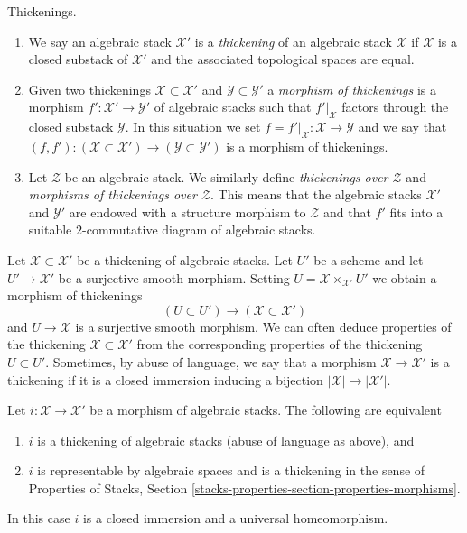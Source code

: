 \begin{definition}
\label{definition-thickening}
Thickenings.
\begin{enumerate}
\item We say an algebraic stack $\mathcal{X}'$ is a {\it thickening}
of an algebraic stack $\mathcal{X}$ if $\mathcal{X}$ is a closed substack
of $\mathcal{X}'$ and the associated topological spaces are equal.
\item Given two thickenings $\mathcal{X} \subset \mathcal{X}'$ and
$\mathcal{Y} \subset \mathcal{Y}'$ a {\it morphism of thickenings}
is a morphism $f' : \mathcal{X}' \to \mathcal{Y}'$ of algebraic stacks
such that $f'|_\mathcal{X}$ factors through the closed
substack $\mathcal{Y}$. In this situation we set
$f = f'|_\mathcal{X} : \mathcal{X} \to \mathcal{Y}$ and we say that
$(f, f') : (\mathcal{X} \subset \mathcal{X}') \to
(\mathcal{Y} \subset \mathcal{Y}')$ is a morphism of thickenings.
\item Let $\mathcal{Z}$ be an algebraic stack. We similarly define
{\it thickenings over $\mathcal{Z}$} and
{\it morphisms of thickenings over $\mathcal{Z}$}.
This means that the algebraic stacks
$\mathcal{X}'$ and $\mathcal{Y}'$
are endowed with a structure
morphism to $\mathcal{Z}$ and that $f'$ fits into a suitable
$2$-commutative diagram of algebraic stacks.
\end{enumerate}
\end{definition}

\noindent
Let $\mathcal{X} \subset \mathcal{X}'$ be a thickening of algebraic stacks.
Let $U'$ be a scheme and let $U' \to \mathcal{X}'$ be a surjective smooth
morphism. Setting $U = \mathcal{X} \times_{\mathcal{X}'} U'$ we obtain
a morphism of thickenings
$$
(U \subset U') \longrightarrow (\mathcal{X} \subset \mathcal{X}')
$$
and $U \to \mathcal{X}$ is a surjective smooth morphism. We can often
deduce properties of the thickening $\mathcal{X} \subset \mathcal{X}'$
from the corresponding properties of the thickening $U \subset U'$.
Sometimes, by abuse of language, we say that a morphism
$\mathcal{X} \to \mathcal{X}'$ is a thickening if it is a closed
immersion inducing a bijection $|\mathcal{X}| \to |\mathcal{X}'|$.

\begin{lemma}
\label{lemma-thickening}
Let $i : \mathcal{X} \to \mathcal{X}'$ be a morphism of algebraic stacks.
The following are equivalent
\begin{enumerate}
\item $i$ is a thickening of algebraic stacks (abuse of language as above), and
\item $i$ is representable by algebraic spaces and
is a thickening in the sense of Properties of Stacks, Section
\ref{stacks-properties-section-properties-morphisms}.
\end{enumerate}
In this case $i$ is a closed immersion and a universal homeomorphism.
\end{lemma}

